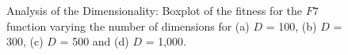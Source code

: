 \begin{figure}[!h]
\hspace{1mm}
\caption{\small{Analysis of the Dimensionality: Boxplot of the fitness for the $F7$ function varying the number of dimensions for (a) $D$ = 100, (b) $D$ = 300, (c) $D$ = 500 and (d) $D$ = 1,000.}}
\label{fig:Dimensionality_F7}
\end{figure}

